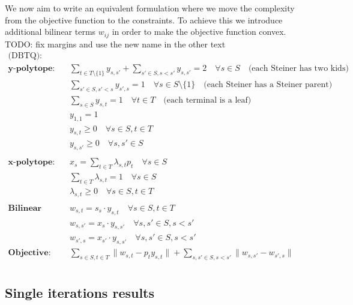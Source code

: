 \documentclass[12pt,a4paper]{article}
\numberwithin{equation}{section}
\theoremstyle{mytheorem}
\theoremstyle{myremark}
\theoremstyle{myparagraph}
\begin{document}
    We now aim to write an equivalent formulation where we move the complexity from the objective function to the constraints.
    To achieve this we introduce additional bilinear terms $w_{ij}$ in order to make the objective function convex.
    TODO: fix margins and use the new name in the other text
    \begin{align}
        \text{(DBTQ)}: \; & \label{formulation:dbtq} \\
        \textbf{y-polytope:} \quad & \sum_{t \in T \setminus \{1\}} y_{s,s'} + \sum_{s' \in S, s < s'} y_{s,s'} = 2 \quad \forall s \in S \quad \text{(each Steiner has two kids)} \\
        & \sum_{s' \in S, s' < s} y_{s',s} = 1 \quad \forall s \in S \setminus \{1\} \quad \text{(each Steiner has a Steiner parent)} \\
        & \sum_{s \in S} y_{s,t} = 1 \quad \forall t \in T \quad \text{(each terminal is a leaf)} \\
        & y_{1,1} = 1 \\
        & y_{s,t} \geq 0 \quad \forall s \in S, t \in T \\
        & y_{s,s'} \geq 0 \quad \forall s, s' \in S \\
        \\
        \textbf{x-polytope:} \quad & x_s = \sum_{t \in T} \lambda_{s,t} p_t \quad \forall s \in S \\
        & \sum_{t \in T} \lambda_{s,t} = 1 \quad \forall s \in S \\
        & \lambda_{s,t} \geq 0 \quad \forall s \in S, t \in T \\
        \\
        \textbf{Bilinear terms:} \quad & w_{s,t} = s_s \cdot y_{s,t} \quad \forall s \in S, t \in T \\
        & w_{s,s'} = x_s \cdot y_{s,s'} \quad \forall s, s' \in S, s < s' \\
        & w_{s',s} = x_{s'} \cdot y_{s,s'} \quad \forall s, s' \in S, s < s' \\
        \textbf{Objective:} \quad & \sum_{s \in S, t \in T} \| w_{s,t} - p_t y_{s,t} \| + \sum_{s, s' \in S, s < s'} \| w_{s,s'} - w_{s',s} \| \\
    \end{align}

    

    \subsection{Single iterations results}
\end{document}
